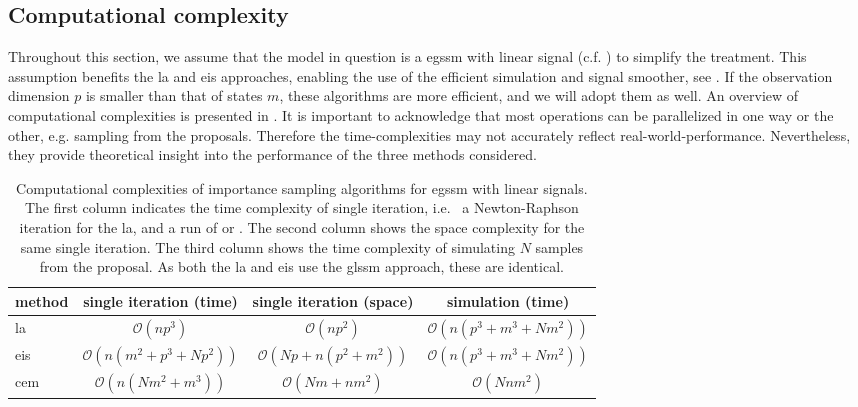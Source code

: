 \subsection{Computational complexity}
\label{subsec:computational-complexity}
Throughout this section, we assume that the model in question is a \gls{egssm} with linear signal (c.f. ) to simplify the treatment. This assumption benefits the \gls{la} and \gls{eis} approaches, enabling the use of the efficient simulation and signal smoother, see . If the observation dimension $p$ is smaller than that of states $m$, these algorithms are more efficient, and we will adopt them as well.
An overview of computational complexities is presented in . It is important to acknowledge that most operations can be parallelized in one way or the other, e.g. sampling from the proposals. Therefore the time-complexities may not accurately reflect real-world-performance. Nevertheless, they provide theoretical insight into the performance of the three methods considered.

\begin{table}
    \centering
    \begin{tabular}{lccc}
        \toprule 
        method & single iteration (time) & single iteration (space) & simulation (time)\\
        \midrule
        \gls{la} & $\mathcal O (n p^{3})$ & $\mathcal O (np^{2})$ & $\mathcal O(n (p^{3} + m^{3} + Nm^{2}))$ \\
        \gls{eis} & $\mathcal O (n(m^{2} + p^{3} + Np^{2}))$ & $\mathcal O (Np + n(p^{2} + m^{2}))$ & $\mathcal O(n (p^{3} + m^{3} + Nm^{2}))$\\
        \gls{cem} & $\mathcal O (n (Nm^{2} + m^{3}))$& $\mathcal O (Nm + nm^{2})$ & $\mathcal O (Nnm^{2})$\\
        \bottomrule
    \end{tabular}
    \caption{Computational complexities of importance sampling algorithms for \gls{egssm} with linear signals. The first column indicates the time complexity of single iteration, i.e.~ a Newton-Raphson iteration for the \gls{la}, and a run of  or . The second column shows the space complexity for the same single iteration. The third column shows the time complexity of simulating $N$ samples from the proposal. As both the \gls{la} and \gls{eis} use the \gls{glssm} approach, these are identical.}
    \label{tab:comparison-time-space-complexity}
\end{table}

